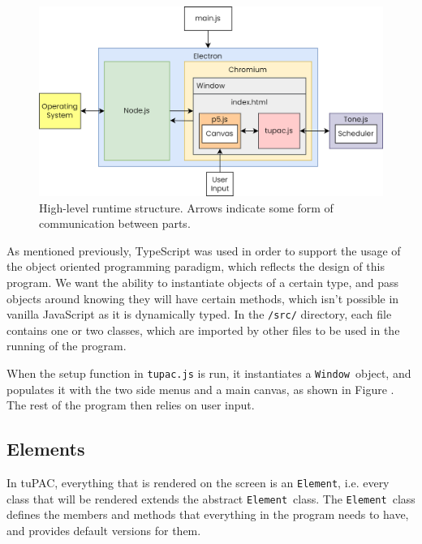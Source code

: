 \documentclass[12pt,a4paper,twoside,openright]{report}
\newcommand{\element}{\texttt{Element}}
\newcommand{\window}{\texttt{Window}}
\begin{document}
\begin{figure}[h]
    \centering
    \includegraphics[scale=0.4]{images/tuPAC_structure.png}
    \caption{High-level runtime structure. Arrows indicate some form of communication between parts.}
    \label{fig:tupac_structure}
\end{figure}

As mentioned previously, TypeScript was used in order to support the usage of the object oriented programming paradigm, which reflects the design of this program. We want the ability to instantiate objects of a certain type, and pass objects around knowing they will have certain methods, which isn't possible in vanilla JavaScript as it is dynamically typed. In the \verb|/src/| directory, each file contains one or two classes, which are imported by other files to be used in the running of the program.

When the setup function in \verb|tupac.js| is run, it instantiates a \window\ object, and populates it with the two side menus and a main canvas, as shown in Figure . The rest of the program then relies on user input.

\subsection{Elements}
In tuPAC, everything that is rendered on the screen is an \element, i.e. every class that will be rendered extends the abstract \element\ class. The \element\ class defines the members and methods that everything in the program needs to have, and provides default versions for them.
\end{document}
